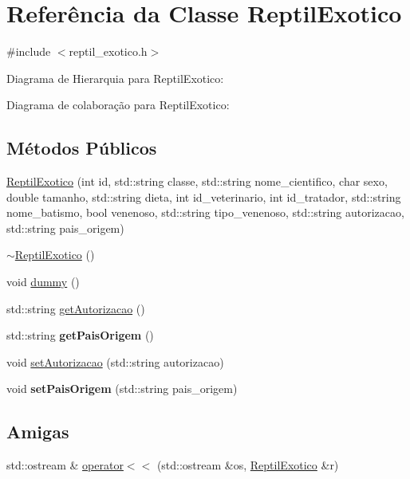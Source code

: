 \hypertarget{classReptilExotico}{}\section{Referência da Classe Reptil\+Exotico}
\label{classReptilExotico}


{\ttfamily \#include $<$reptil\+\_\+exotico.\+h$>$}



Diagrama de Hierarquia para Reptil\+Exotico\+:


Diagrama de colaboração para Reptil\+Exotico\+:
\subsection*{Métodos Públicos}
\begin{DoxyCompactItemize}
\item 
\hyperlink{classReptilExotico_a2a7126e82ab5b10ff0c1af3c827e0c36}{Reptil\+Exotico} (int id, std\+::string classe, std\+::string nome\+\_\+cientifico, char sexo, double tamanho, std\+::string dieta, int id\+\_\+veterinario, int id\+\_\+tratador, std\+::string nome\+\_\+batismo, bool venenoso, std\+::string tipo\+\_\+venenoso, std\+::string autorizacao, std\+::string pais\+\_\+origem)
\item 
\hyperlink{classReptilExotico_abddaff7d11fd31ce5fcd4a2c1b4ee6f1}{$\sim$\+Reptil\+Exotico} ()
\item 
void \hyperlink{classReptilExotico_aa59602e743a05deba4f1ff2fa453607a}{dummy} ()
\item 
std\+::string \hyperlink{classReptilExotico_a0929d82c7a740fbc0f39902b6ec25167}{get\+Autorizacao} ()
\item 
\mbox{\label{classReptilExotico_ab6811f54c0e2f787ee2fa16287b9ec8a}} 
std\+::string {\bfseries get\+Pais\+Origem} ()
\item 
void \hyperlink{classReptilExotico_a364d9e440d0c1f6ae8c03bdb51289502}{set\+Autorizacao} (std\+::string autorizacao)
\item 
\mbox{\label{classReptilExotico_af0c686184f9d2bf5c617d177ec961181}} 
void {\bfseries set\+Pais\+Origem} (std\+::string pais\+\_\+origem)
\end{DoxyCompactItemize}
\subsection*{Amigas}
\begin{DoxyCompactItemize}
\item 
std\+::ostream \& \hyperlink{classReptilExotico_a1ddae6ad589e0969d123b6cbe3f70a67}{operator$<$$<$} (std\+::ostream \&os, \hyperlink{classReptilExotico}{Reptil\+Exotico} \&r)
\end{DoxyCompactItemize}
